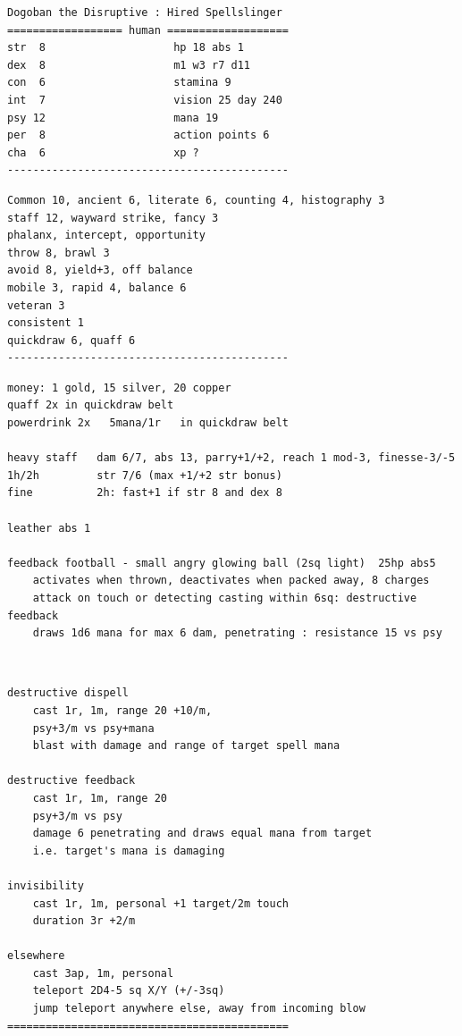 \small \begin{samepage} \begin{verbatim}
Dogoban the Disruptive : Hired Spellslinger
================== human ===================
str  8                    hp 18 abs 1
dex  8                    m1 w3 r7 d11
con  6                    stamina 9
int  7                    vision 25 day 240
psy 12                    mana 19
per  8                    action points 6
cha  6                    xp ?
--------------------------------------------
\end{verbatim} \goodbreak \begin{verbatim}
Common 10, ancient 6, literate 6, counting 4, histography 3
staff 12, wayward strike, fancy 3
phalanx, intercept, opportunity
throw 8, brawl 3
avoid 8, yield+3, off balance
mobile 3, rapid 4, balance 6
veteran 3
consistent 1
quickdraw 6, quaff 6
--------------------------------------------
\end{verbatim} \goodbreak \begin{verbatim}
money: 1 gold, 15 silver, 20 copper
quaff 2x in quickdraw belt
powerdrink 2x   5mana/1r   in quickdraw belt

heavy staff   dam 6/7, abs 13, parry+1/+2, reach 1 mod-3, finesse-3/-5
1h/2h         str 7/6 (max +1/+2 str bonus)
fine          2h: fast+1 if str 8 and dex 8

leather abs 1

feedback football - small angry glowing ball (2sq light)  25hp abs5
    activates when thrown, deactivates when packed away, 8 charges
    attack on touch or detecting casting within 6sq: destructive feedback
    draws 1d6 mana for max 6 dam, penetrating : resistance 15 vs psy
\end{verbatim} \end{samepage} \ \goodbreak \begin{samepage} \begin{verbatim}
destructive dispell
    cast 1r, 1m, range 20 +10/m, 
    psy+3/m vs psy+mana
    blast with damage and range of target spell mana

destructive feedback
    cast 1r, 1m, range 20
    psy+3/m vs psy
    damage 6 penetrating and draws equal mana from target
    i.e. target's mana is damaging

invisibility
    cast 1r, 1m, personal +1 target/2m touch
    duration 3r +2/m

elsewhere
    cast 3ap, 1m, personal
    teleport 2D4-5 sq X/Y (+/-3sq)
    jump teleport anywhere else, away from incoming blow
============================================
\end{verbatim} \end{samepage} \normalsize
